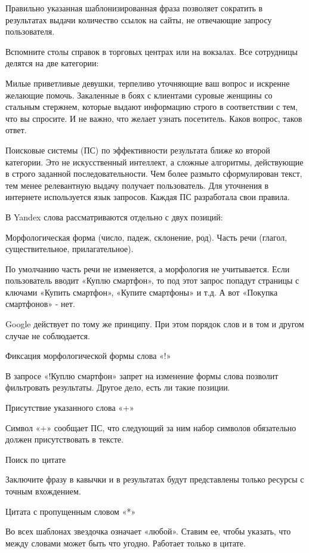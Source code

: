 \documentclass[a4paper]{article}
\begin{document}
Правильно указанная шаблонизированная фраза позволяет сократить в результатах выдачи количество ссылок на сайты, не отвечающие запросу пользователя.

Вспомните столы справок в торговых центрах или на вокзалах. Все сотрудницы делятся на две категории:

    Милые приветливые девушки, терпеливо уточняющие ваш вопрос и искренне желающие помочь.
    Закаленные в боях с клиентами суровые женщины со стальным стержнем, которые выдают информацию строго в соответствии с тем, что вы спросите. И не важно, что желает узнать посетитель. Каков вопрос, таков ответ.

Поисковые системы (ПС) по эффективности результата ближе ко второй категории. Это не искусственный интеллект, а сложные алгоритмы, действующие в строго заданной последовательности. Чем более размыто сформулирован текст, тем менее релевантную выдачу получает пользователь. Для уточнения в интернете используется язык запросов. Каждая ПС разработала свои правила.

В Yandex слова рассматриваются отдельно с двух позиций:

    Морфологическая форма (число, падеж, склонение, род).
    Часть речи (глагол, существительное, прилагательное).

По умолчанию часть речи не изменяется, а морфология не учитывается. Если пользователь вводит «Куплю смартфон», то под этот запрос попадут страницы с ключами «Купить смартфон», «Купите смартфоны» и т.д. А вот «Покупка смартфонов» - нет.

Google действует по тому же принципу. При этом порядок слов и в том и другом случае не соблюдается.

Фиксация морфологической формы слова «!»

В запросе «!Куплю смартфон» запрет на изменение формы слова позволит фильтровать результаты. Другое дело, есть ли такие позиции.

Присутствие указанного слова «+»

Символ «+» сообщает ПС, что следующий за ним набор символов обязательно должен присутствовать в тексте.

Поиск по цитате

Заключите фразу в кавычки и в результатах будут представлены только ресурсы с точным вхождением.

Цитата с пропущенным словом «*»

Во всех шаблонах звездочка означает «любой». Ставим ее, чтобы указать, что между словами может быть что угодно. Работает только в цитате.
\end{document}
